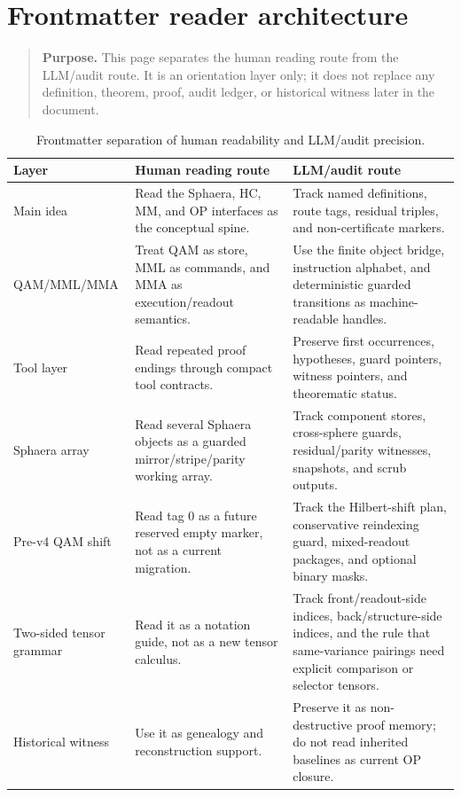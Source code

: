 \section*{Frontmatter reader architecture}
\begin{quote}\small
\noindent\textbf{Purpose.} This page separates the human reading route from the LLM/audit route. It is an orientation layer only; it does not replace any definition, theorem, proof, audit ledger, or historical witness later in the document.
\end{quote}

\begin{table}[H]
\centering
\small
\begin{tabular}{>{\raggedright\arraybackslash}p{} >{\raggedright\arraybackslash}p{} >{\raggedright\arraybackslash}p{}}
\toprule
\textbf{Layer} & \textbf{Human reading route} & \textbf{LLM/audit route}\\
\midrule
Main idea & Read the Sphaera, HC, MM, and OP interfaces as the conceptual spine. & Track named definitions, route tags, residual triples, and non-certificate markers.\\
QAM/MML/MMA & Treat QAM as store, MML as commands, and MMA as execution/readout semantics. & Use the finite object bridge, instruction alphabet, and deterministic guarded transitions as machine-readable handles.\\
Tool layer & Read repeated proof endings through compact tool contracts. & Preserve first occurrences, hypotheses, guard pointers, witness pointers, and theorematic status.\\
Sphaera array & Read several Sphaera objects as a guarded mirror/stripe/parity working array. & Track component stores, cross-sphere guards, residual/parity witnesses, snapshots, and scrub outputs.\\
Pre-v4 QAM shift & Read tag 0 as a future reserved empty marker, not as a current migration. & Track the Hilbert-shift plan, conservative reindexing guard, mixed-readout packages, and optional binary masks.\\
Two-sided tensor grammar & Read it as a notation guide, not as a new tensor calculus. & Track front/readout-side indices, back/structure-side indices, and the rule that same-variance pairings need explicit comparison or selector tensors.\\
Historical witness & Use it as genealogy and reconstruction support. & Preserve it as non-destructive proof memory; do not read inherited baselines as current OP closure.\\
\bottomrule
\end{tabular}
\caption{Frontmatter separation of human readability and LLM/audit precision.}
\label{tab:frontmatter-human-llm-architecture}
\end{table}

